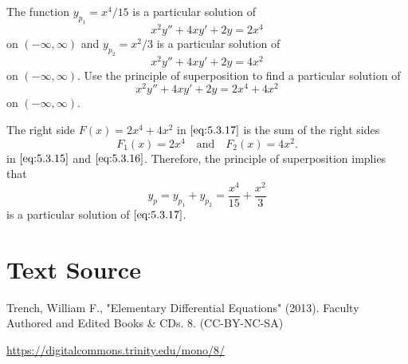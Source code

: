\documentclass{ximera}
\begin{document}
\begin{example}\label{example:5.3.4}
The function
 $y_{p_1}=x^4/15$ is a   particular solution of
\begin{equation} \label{eq:5.3.15}
x^2y''+4xy'+2y=2x^4
\end{equation}
on $(-\infty,\infty)$
and  $y_{p_2}=x^2/3$  is a particular solution of
\begin{equation} \label{eq:5.3.16}
x^2y''+4xy'+2y=4x^2
\end{equation}
on $(-\infty,\infty)$.
Use  the principle of superposition to
find a particular solution of
\begin{equation} \label{eq:5.3.17}
x^2y''+4xy'+2y=2x^4+4x^2
\end{equation}
on $(-\infty,\infty)$.
 
 
\begin{explanation}  The right side $F(x)=2x^4+4x^2$ in $\eqref{eq:5.3.17}$
is the sum of the right sides
$$
F_1(x)=2x^4\quad\mbox{and}\quad F_2(x)=4x^2.
$$
in  $\eqref{eq:5.3.15}$  and $\eqref{eq:5.3.16}$.
Therefore, the principle of superposition implies that
$$
y_p=y_{p_1}+y_{p_2}=\frac{x^4}{15}+\frac{x^2}{3}
$$
is a particular solution of $\eqref{eq:5.3.17}$.
\end{explanation}
\end{example}
 
\section*{Text Source}
Trench, William F., "Elementary Differential Equations" (2013). Faculty Authored and Edited Books \& CDs. 8. (CC-BY-NC-SA)
 
\href{https://digitalcommons.trinity.edu/mono/8/}{https://digitalcommons.trinity.edu/mono/8/}
 
\end{document}
